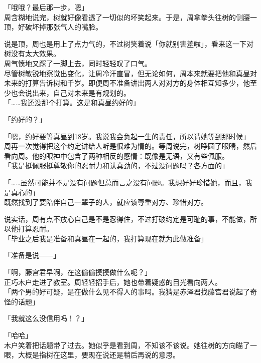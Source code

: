 「哦哦？最后那一步，嗯」\\

周含糊地说完，树就好像看透了一切似的坏笑起来。于是，周拿拳头往树的侧腰一顶，好破坏掉那张气人的嘴脸。

说是顶，周也是用上了点力气的，不过树笑着说「你就别害羞啦」，看来这一下对树没有太大效果。\\

周气愤地又踩了一脚上去，同时轻轻叹了口气。\\

尽管树敏锐地察觉出变化，让周冷汗直冒，但无论如何，周本来就要把他和真昼对未来的打算告诉树和千岁。即便周不准备讲出两人对对方的身体相互知多少，他至少也会说出来，自己对未来是有规划的。\\

「……我还没那个打算。这是和真昼约好的」

「约好的？」

「嗯，约好要等真昼到18岁。我说我会负起一生的责任，所以请她等到那时候」\\

周再一次觉得把这个约定讲给人听是很难为情的。等周说完，树睁圆了眼睛，然后看向周。他的眼神中包含了两种相反的感情：既像是无语，又有些佩服。\\

「我是挺佩服挺尊敬你的忍耐力和认真劲的，不过没问题吗？各方面的」

「……虽然可能并不是没有问题但总而言之没有问题。我想好好珍惜她，而且，我是真心的」\\

既然找到了要陪伴自己一辈子的人，就应该尊重对方、珍惜对方。

说实话，周有点不放心自己是不是忍得住，不过打破约定是可耻的事，不能做，所以他打算忍耐。\\

「毕业之后我是准备和真昼在一起的，我打算现在就为此做准备」

「准备是说——」

「啊，藤宫君早啊，在这偷偷摸摸做什么呢？」\\

正巧木户走进了教室。周轻轻招手后，她也带着疑惑的目光看向两人。\\

「两个男的好可疑，是在做什么见不得人的事吗。我猜是赤泽君找藤宫君说起了奇怪的话题」

「我就这么没信用吗！？」

「哈哈」\\

木户笑着把话题带了过去。她似乎是看到周，不知该不该说。她往树的方向瞄了一眼，大概是指树在这里，要现在说还是稍后再说的意思。

